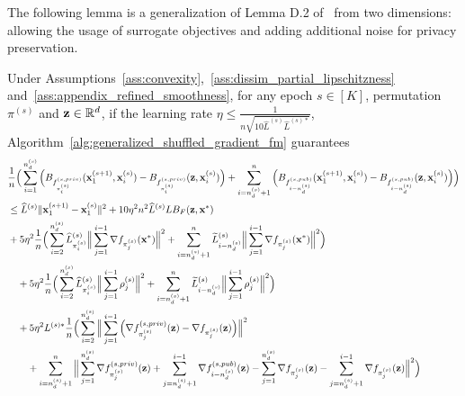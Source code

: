 The following lemma is a generalization of Lemma D.2 of~\cite{liu2024last_iterate_shuffled_gradient} from two dimensions: allowing the usage of surrogate objectives and adding additional noise for privacy preservation.


\begin{lemma}
\label{lemma:one_epoch_bound_bregmandiv}
    Under Assumptions~\ref{ass:convexity},~\ref{ass:dissim_partial_lipschitzness} and~\ref{ass:appendix_refined_smoothness}, for any epoch $s\in [K]$, permutation $\pi^{(s)}$ and ${\mathbf{z}}\in\mathbb{R}^d$, if the learning rate $\eta \leq \frac{1}{n \sqrt{10 \widehat{L}^{(s)} \widehat{L}^{(s)*}}}$, Algorithm~\ref{alg:generalized_shuffled_gradient_fm} guarantees
        \begin{align}
        &\frac{1}{n} \Big(\sum_{i=1}^{n_d^{(s)}}
        \Big( B_{f_{\pi_i^{(s)}}^{(s, priv)}}({\mathbf{x}}_{1}^{(s+1)}, {\mathbf{x}}_i^{(s)})
        - B_{f_{\pi_i^{(s)}}^{(s, priv)}}({\mathbf{z}}, {\mathbf{x}}_i^{(s)}) \Big)
        + \sum_{i=n_d^{(s)}+1}^{n}\Big(
            B_{f_{i-n_d^{(s)}}^{(s,pub)}}({\mathbf{x}}_1^{(s+1)}, {\mathbf{x}}_i^{(s)})
            - B_{f_{i-n_d^{(s)}}^{(s, pub)}}({\mathbf{z}}, {\mathbf{x}}_i^{(s)})
        \Big)
        \Big) \\
        \nonumber
        &\leq \widehat{L}^{(s)} \|{\mathbf{x}}_{1}^{(s+1)} - {\mathbf{x}}_1^{(s)}\|^2
        + 10\eta^2 n^2 \widehat{L}^{(s)} L B_F({\mathbf{z}}, {\mathbf{x}}^*)
        \\
        \nonumber
        &
        + 5 \eta^2 \frac{1}{n} \Big(\sum_{i=2}^{n_d^{(s)}}\widehat{L}_{\pi_i^{(s)}}^{(s)}\Big\| \sum_{j=1}^{i-1} \nabla f_{\pi_j^{(s)}}({\mathbf{x}}^*)\Big\|^2
        + \sum_{i=n_d^{(s)}+1}^{n}\widetilde{L}_{i-n_d^{(s)}}^{(s)}\Big\| \sum_{j=1}^{i-1}\nabla f_{\pi_j^{(s)}}({\mathbf{x}}^*)\Big\|^2 \Big)\\
        \nonumber
        &\quad 
        + 5\eta^2 \frac{1}{n} \Big( \sum_{i=2}^{n_d^{(s)}} \widehat{L}_{\pi_i^{(s)}}^{(s)} \Big\| \sum_{j=1}^{i-1} \rho_j^{(s)}\Big\|^2
        + \sum_{i=n_d^{(s)}+1}^{n} \widetilde{L}_{i-n_d^{(s)}}^{(s)}\Big\| \sum_{j=1}^{i-1} \rho_j^{(s)}\Big\|^2\Big)\\
        \nonumber
        &\quad + 5\eta^2 L^{(s)*} \frac{1}{n}\Big(\sum_{i=2}^{n_d^{(s)}}
        \Big\| \sum_{j=1}^{i-1} \Big( \nabla f_{\pi_j^{(s)}}^{(s, priv)}({\mathbf{z}}) - \nabla f_{\pi_j^{(s)}}({\mathbf{z}})\Big) \Big\|^2
        \\
        \nonumber
        &\quad \quad + \sum_{i=n_d^{(s)} + 1}^{n} \Big\| \sum_{j=1}^{n_d^{(s)}} \nabla f_{\pi_j^{(s)}}^{(s, priv)}({\mathbf{z}}) + \sum_{j=n_d^{(s)}+1}^{i-1} \nabla f_{i-n_d^{(s)}}^{(s, pub)}({\mathbf{z}})
            - \sum_{j=1}^{n_d^{(s)}} \nabla f_{\pi_j^{(s)}}({\mathbf{z}}) - \sum_{j=n_d^{(s)}+1}^{i-1} \nabla f_{\pi_j^{(s)}}({\mathbf{z}})
        \Big\|^2
        \Big)
    \end{align}
    
\end{lemma}



